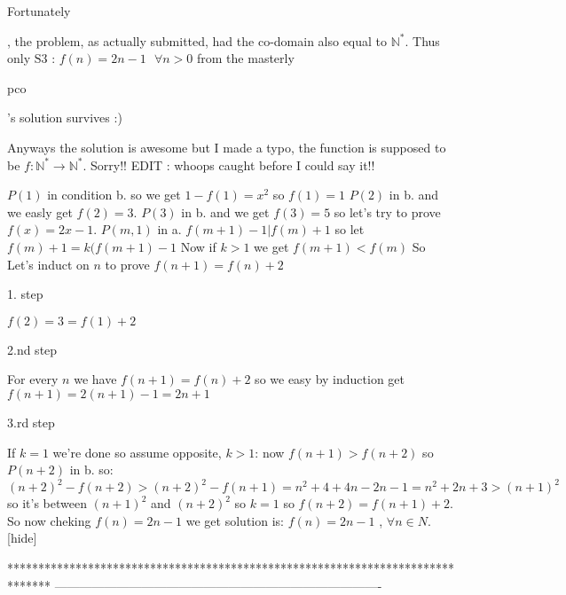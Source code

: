 \begin{solution}
	\begin{bolded}Fortunately\end{bolded}, the problem, as actually submitted, had the co-domain also equal to $\mathbb{N}^*$. 
Thus only $\boxed{\text{S3 : }f(n)=2n-1\text{   }\forall n>0}$ from the masterly \begin{bolded}pco\end{bolded}'s solution survives :)
\end{solution}



\begin{solution}
	Anyways the solution is awesome but I made a typo, the function is supposed to be $f:\mathbb{N}^{\ast}\to \mathbb{N}^{\ast}$. Sorry!!
EDIT : whoops caught before I could say it!!
\end{solution}



\begin{solution}
$P(1)$ in condition b. so we get $1-f(1)=x^{2}$ so $f(1)=1$
$P(2)$ in b. and we easly get $f(2)=3$.
$P(3)$ in b. and we get $f(3)=5$ so let's try to prove $f(x)=2x-1$.
$P(m,1)$ in a. $f(m+1)-1|f(m)+1$ so let $f(m)+1=k(f(m+1)-1$
Now if $k>1$ we  get $f(m+1)<f(m)$ 
So Let's induct on $n$ to prove $f(n+1)=f(n)+2$
\begin{bolded}1. step\end{bolded}$f(2)=3=f(1)+2$
\begin{bolded}2.nd step\end{bolded}For every $n$ we have $f(n+1)=f(n)+2$ so we easy by induction get $f(n+1)=2(n+1)-1=2n+1$
\begin{bolded}3.rd step\end{bolded}If $k=1$ we're done so assume opposite, $k>1$:
now $f(n+1)>f(n+2)$ so $P(n+2)$ in b. so:
$(n+2)^{2}-f(n+2)>(n+2)^{2}-f(n+1)=n^{2}+4+4n-2n-1=n^{2}+2n+3>(n+1)^{2}$ so it's between $(n+1)^2$ and $(n+2)^{2}$ so $k=1$ so $f(n+2)=f(n+1)+2$.
So now cheking $f(n)=2n-1$ we get solution is:
$f(n)=2n-1$ , $\forall n \in N$.
[\/hide]
\end{solution}
*******************************************************************************
-------------------------------------------------------------------------------

